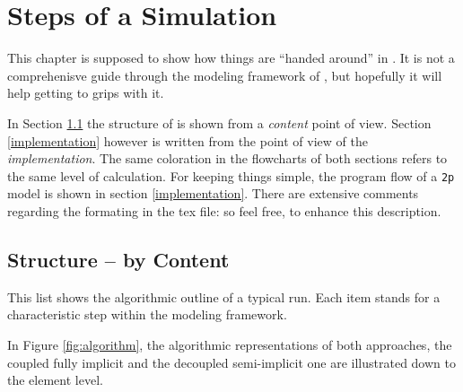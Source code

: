 \section{Steps of a \Dumux Simulation}
\label{flow}


This chapter is supposed to show how things are ``handed around'' in \Dumux. It
is not a comprehenisve guide through the modeling framework of \Dumux, but
hopefully it will help getting to grips with it.

In Section \ref{content} the structure of \Dumux is shown from a \emph{content}
point of view.
Section \ref{implementation} however is written from the point of view of the \emph{implementation}.
The same coloration in the flowcharts of both sections refers to the same level of calculation. For keeping things 
simple, the program flow of a \verb+2p+ model is shown in section \ref{implementation}. There are extensive comments 
regarding the formating in the tex file: so feel free, to enhance this description.

\subsection{Structure -- by Content}

\label{content}
This list shows the algorithmic outline of a typical \Dumux run. Each item stands
for a characteristic step within the modeling framework.

In Figure \ref{fig:algorithm}, the algorithmic representations of both approaches, the coupled fully 
implicit and the decoupled semi-implicit one are illustrated down to the element level.

